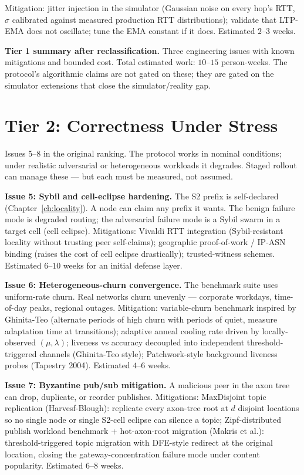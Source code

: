 \documentclass[twoside,nobib]{tufte-book}
\begin{document}
Mitigation: jitter injection in the simulator (Gaussian noise
on every hop's RTT, $\sigma$ calibrated against measured
production RTT distributions); validate that LTP-EMA does not
oscillate; tune the EMA constant if it does. Estimated
$2$--$3$ weeks.

\textbf{Tier 1 summary after reclassification.} Three engineering
issues with known mitigations and bounded cost. Total
estimated work: $10$--$15$ person-weeks. The protocol's
algorithmic claims are not gated on these; they are gated on
the simulator extensions that close the
simulator/reality gap.

\section{Tier 2: Correctness Under Stress}

Issues 5--8 in the original ranking. The protocol works in
nominal conditions; under realistic adversarial or heterogeneous
workloads it degrades. Staged rollout can manage these --- but
each must be measured, not assumed.

\textbf{Issue 5: Sybil and cell-eclipse hardening.} The S2
prefix is self-declared (Chapter~\ref{ch:locality}). A node can
claim any prefix it wants. The benign failure mode is degraded
routing; the adversarial failure mode is a Sybil swarm in a
target cell (cell eclipse). Mitigations: Vivaldi RTT
integration (Sybil-resistant locality without trusting peer
self-claims); geographic proof-of-work / IP-ASN binding (raises
the cost of cell eclipse drastically); trusted-witness schemes.
Estimated $6$--$10$ weeks for an initial defense layer.

\textbf{Issue 6: Heterogeneous-churn convergence.} The
benchmark suite uses uniform-rate churn. Real networks churn
unevenly --- corporate workdays, time-of-day peaks, regional
outages. Mitigation: variable-churn benchmark inspired by
Ghinita-Teo (alternate periods of high churn with periods of
quiet, measure adaptation time at transitions); adaptive
anneal cooling rate driven by locally-observed
$(\mu, \lambda)$; liveness vs accuracy decoupled into
independent threshold-triggered channels (Ghinita-Teo style);
Patchwork-style background liveness probes (Tapestry 2004).
Estimated $4$--$6$ weeks.

\textbf{Issue 7: Byzantine pub/sub mitigation.} A malicious
peer in the axon tree can drop, duplicate, or reorder
publishes. Mitigations: MaxDisjoint topic replication
(Harvesf-Blough): replicate every axon-tree root at $d$
disjoint locations so no single node or single S2-cell eclipse
can silence a topic; Zipf-distributed publish workload
benchmark + hot-axon-root migration (Makris et al.):
threshold-triggered topic migration with DFE-style redirect at
the original location, closing the gateway-concentration
failure mode under content popularity. Estimated $6$--$8$ weeks.
\end{document}
